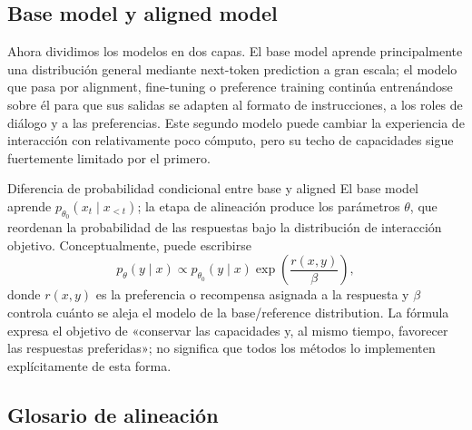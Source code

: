 \subsection{Base model y aligned model}

Ahora dividimos los modelos en dos capas. El base model aprende principalmente una distribución general mediante next-token prediction a gran escala; el modelo que pasa por alignment, fine-tuning o preference training continúa entrenándose sobre él para que sus salidas se adapten al formato de instrucciones, a los roles de diálogo y a las preferencias. Este segundo modelo puede cambiar la experiencia de interacción con relativamente poco cómputo, pero su techo de capacidades sigue fuertemente limitado por el primero.



\begin{importantbox}{Diferencia de probabilidad condicional entre base y aligned}
El base model aprende $p_{\theta_0}(x_t\mid x_{<t})$; la etapa de alineación produce los parámetros $\theta$, que reordenan la probabilidad de las respuestas bajo la distribución de interacción objetivo. Conceptualmente, puede escribirse
\[
p_{\theta}(y\mid x)\propto p_{\theta_0}(y\mid x)\exp\!\left(\frac{r(x,y)}{\beta}\right),
\]
donde $r(x,y)$ es la preferencia o recompensa asignada a la respuesta y $\beta$ controla cuánto se aleja el modelo de la base/reference distribution. La fórmula expresa el objetivo de «conservar las capacidades y, al mismo tiempo, favorecer las respuestas preferidas»; no significa que todos los métodos lo implementen explícitamente de esta forma.
\end{importantbox}


\subsection{Glosario de alineación}


